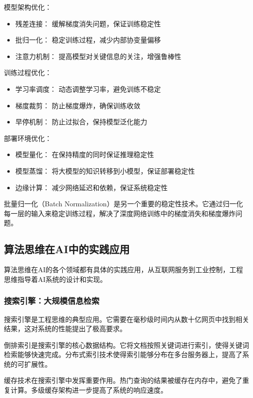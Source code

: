 模型架构优化：
\begin{itemize}
\item 残差连接： 缓解梯度消失问题，保证训练稳定性
\item 批归一化： 稳定训练过程，减少内部协变量偏移
\item 注意力机制： 提高模型对关键信息的关注，增强鲁棒性
\end{itemize}

训练过程优化：
\begin{itemize}
\item 学习率调度： 动态调整学习率，避免训练不稳定
\item 梯度裁剪： 防止梯度爆炸，确保训练收敛
\item 早停机制： 防止过拟合，保持模型泛化能力
\end{itemize}

部署环境优化：
\begin{itemize}
\item 模型量化： 在保持精度的同时保证推理稳定性
\item 模型蒸馏： 将大模型的知识转移到小模型，保证部署稳定性
\item 边缘计算： 减少网络延迟和依赖，保证系统稳定性
\end{itemize}

批量归一化（Batch Normalization）是另一个重要的稳定性技术。它通过归一化每一层的输入来稳定训练过程，解决了深度网络训练中的梯度消失和梯度爆炸问题。

\subsection{算法思维在AI中的实践应用}

算法思维在AI的各个领域都有具体的实践应用，从互联网服务到工业控制，工程思维指导着AI系统的设计和实现。

\subsubsection{搜索引擎：大规模信息检索}

搜索引擎是工程思维的典型应用。它需要在毫秒级时间内从数十亿网页中找到相关结果，这对系统的性能提出了极高要求。

倒排索引是搜索引擎的核心数据结构。它将文档按照关键词进行索引，使得关键词检索能够快速完成。分布式索引技术使得索引能够分布在多台服务器上，提高了系统的可扩展性。

缓存技术在搜索引擎中发挥重要作用。热门查询的结果被缓存在内存中，避免了重复计算。多级缓存架构进一步提高了系统的响应速度。


